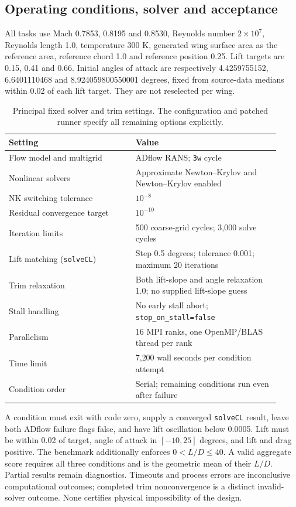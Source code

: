 \subsection{Operating conditions, solver and acceptance}

All tasks use Mach 0.7853, 0.8195 and 0.8530, Reynolds number $2\times10^7$,
Reynolds length 1.0, temperature 300 K, generated wing surface area as the
reference area, reference chord 1.0 and reference position 0.25. Lift targets
are 0.15, 0.41 and 0.66. Initial angles of attack are respectively
4.4259755152, 6.6401110468 and 8.924059800550001 degrees, fixed from source-data
medians within 0.02 of each lift target. They are not reselected per wing.

\begin{table}[htbp]
\centering\small
\caption{Principal fixed solver and trim settings. The configuration and
patched runner specify all remaining options explicitly.}
\label{tab:cfd-solver}
\begin{tabular}{p{0.43\linewidth}p{0.49\linewidth}}
\toprule
Setting & Value \\
\midrule
Flow model and multigrid & ADflow RANS; \texttt{3w} cycle \\
Nonlinear solvers & Approximate Newton--Krylov and Newton--Krylov enabled \\
NK switching tolerance & $10^{-8}$ \\
Residual convergence target & $10^{-10}$ \\
Iteration limits & 500 coarse-grid cycles; 3{,}000 solve cycles \\
Lift matching (\texttt{solveCL}) & Step 0.5 degrees; tolerance 0.001; maximum 20 iterations \\
Trim relaxation & Both lift-slope and angle relaxation 1.0; no supplied lift-slope guess \\
Stall handling & No early stall abort; \texttt{stop\_on\_stall=false} \\
Parallelism & 16 MPI ranks, one OpenMP/BLAS thread per rank \\
Time limit & 7{,}200 wall seconds per condition attempt \\
Condition order & Serial; remaining conditions run even after failure \\
\bottomrule
\end{tabular}
\end{table}

A condition must exit with code zero, supply a converged \texttt{solveCL}
result, leave both ADflow failure flags false, and have lift oscillation below
0.0005. Lift must be within 0.02 of target, angle of attack in $[-10,25]$
degrees, and lift and drag positive. The benchmark additionally enforces
$0<L/D\leq40$. A valid aggregate score requires all three conditions and is
the geometric mean of their $L/D$. Partial results remain diagnostics.
Timeouts and process errors are inconclusive computational outcomes;
completed trim nonconvergence is a distinct invalid-solver outcome. None
certifies physical impossibility of the design.

